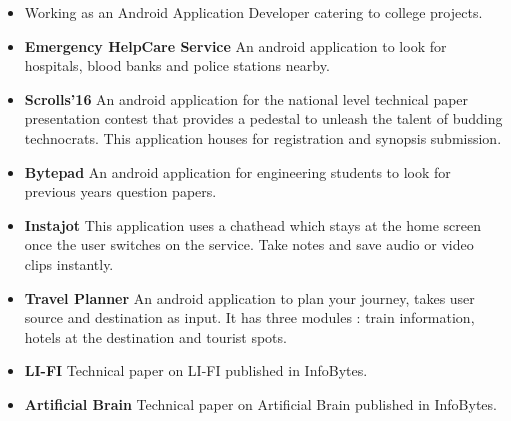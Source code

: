 \documentclass[10pt,a4paper]{altacv}
\begin{document}
\begin{itemize}
\item Working as an Android Application Developer catering to college projects.
\end{itemize}
\begin{itemize}
\item \textbf{Emergency HelpCare Service}
An android application to look for hospitals, blood banks and police stations nearby.
\end{itemize}
\begin{itemize}
\item \textbf{Scrolls'16}
An android application for the national level technical paper
presentation contest that provides a pedestal to unleash the
talent of budding technocrats. This application houses for
registration and synopsis submission.
\end{itemize}
\begin{itemize}
\item \textbf{Bytepad}
An android application for engineering students to look for previous
years question papers.
\end{itemize}
\begin{itemize}
\item \textbf{Instajot}
This application uses a chathead which stays at the home screen
once the user switches on the service. Take notes and save
audio or video clips instantly.
\end{itemize}
\begin{itemize}
\item \textbf{Travel Planner}
An android application to plan your journey, takes user source
and destination as input. It has three modules : train
information, hotels at the destination and tourist spots.
\end{itemize}

\begin{itemize}
\item \textbf{LI-FI} 
Technical paper on LI-FI published in InfoBytes.
\end{itemize}
\begin{itemize}
\item \textbf{Artificial Brain}
Technical paper on Artificial Brain published in InfoBytes.
\end{itemize}

\end{document}
